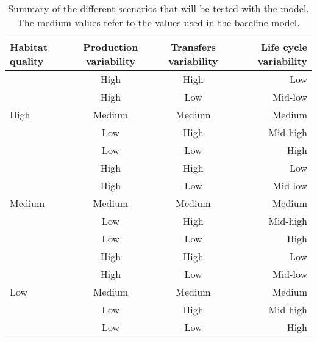 \documentclass{article}
\begin{document}
\begin{table}[H]
    \centering
    \caption{Summary of the different scenarios that will be tested with the model. The medium values refer to the values used in the baseline model.}
    \begin{tabular}{lccr}
    \hline
    Habitat quality & Production variability & Transfers variability & Life cycle variability\\ 
    \hline
    \multirow{5}{*}{High}  & High & High & Low \\
     & High & Low & Mid-low \\
     & Medium & Medium & Medium \\
     & Low & High & Mid-high \\
     & Low & Low & High \\
     \hline
    \multirow{5}{*}{Medium} & High & High & Low \\
     & High & Low & Mid-low \\
     & Medium & Medium & Medium \\
     & Low & High & Mid-high \\
     & Low & Low & High \\
     \hline
    \multirow{5}{*}{Low} & High & High & Low \\
     & High & Low & Mid-low \\
     & Medium & Medium & Medium \\
     & Low & High & Mid-high \\
     & Low & Low & High \\
    \hline
    \end{tabular}
    \label{tab:1}
\end{table}
\end{document}

